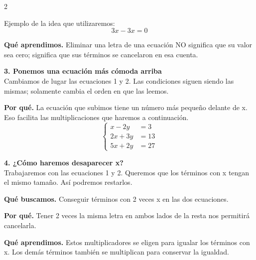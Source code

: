\documentclass[11pt,a4paper,landscape]{article}
\begin{document}
\begin{multicols*}{2}
\begin{minipage}{\linewidth}
\par\smallskip Ejemplo de la idea que utilizaremos:
\[3x-3x=0\]
\par\smallskip\textbf{Qué aprendimos.} Eliminar una letra de una ecuación NO significa que su valor sea cero; significa que sus términos se cancelaron en esa cuenta.
\end{minipage}\par\medskip
\noindent\begin{minipage}{\linewidth}\textbf{3. Ponemos una ecuación más cómoda arriba}\\[2pt]Cambiamos de lugar las ecuaciones 1 y 2. Las condiciones siguen siendo las mismas; solamente cambia el orden en que las leemos.
\par\smallskip\textbf{Por qué.} La ecuación que subimos tiene un número más pequeño delante de x. Eso facilita las multiplicaciones que haremos a continuación.
\[\left\{\begin{aligned}x - 2y &= 3\\2x + 3y &= 13\\5x + 2y &= 27\end{aligned}\right.\]
\end{minipage}\par\medskip
\noindent\begin{minipage}{\linewidth}\textbf{4. ¿Cómo haremos desaparecer x?}\\[2pt]Trabajaremos con las ecuaciones 1 y 2. Queremos que los términos con x tengan el mismo tamaño. Así podremos restarlos.
\par\smallskip\textbf{Qué buscamos.} Conseguir términos con 2 veces x en las dos ecuaciones.
\par\smallskip\textbf{Por qué.} Tener 2 veces la misma letra en ambos lados de la resta nos permitirá cancelarla.
\par{}\par\smallskip
\par\smallskip\textbf{Qué aprendimos.} Estos multiplicadores se eligen para igualar los términos con x. Los demás términos también se multiplican para conservar la igualdad.

\end{minipage}
\end{multicols*}
\end{document}
